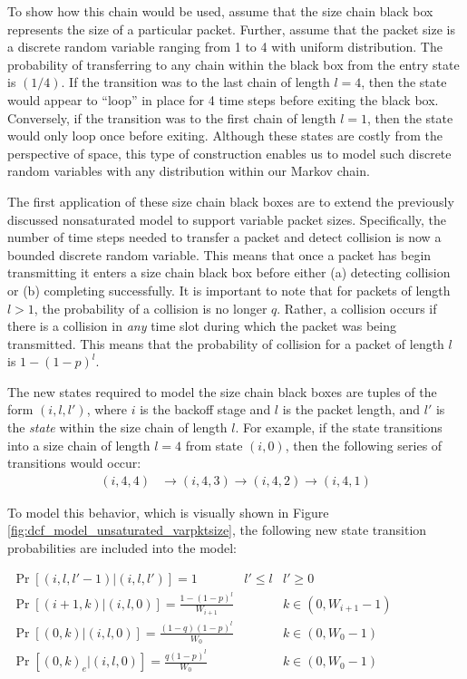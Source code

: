 \documentclass[conference]{IEEEtran}
\begin{document}
To show how this chain would be used, assume that the size chain black box represents the size of a particular packet. Further, assume that the packet size is a discrete random variable ranging from 1 to 4 with uniform distribution. The probability of transferring to any chain within the black box from the entry state is $(1/4)$. If the transition was to the last chain of length $l = 4$, then the state would appear to ``loop'' in place for 4 time steps before exiting the black box. Conversely, if the transition was to the first chain of length $l = 1$, then the state would only loop once before exiting. Although these states are costly from the perspective of space, this type of construction enables us to model such discrete random variables with any distribution within our Markov chain. 

The first application of these size chain black boxes are to extend the previously discussed nonsaturated model to support variable packet sizes. Specifically, the number of time steps needed to transfer a packet and detect collision is now a bounded discrete random variable. This means that once a packet has begin transmitting it enters a size chain black box before either (a) detecting collision or (b) completing successfully. It is important to note that for packets of length $l > 1$, the probability of a collision is no longer $q$. Rather, a collision occurs if there is a collision in \emph{any} time slot during which the packet was being transmitted. This means that the probability of collision for a packet of length $l$ is $1 - (1 - p)^l$. 

The new states required to model the size chain black boxes are tuples of the form $(i, l, l')$, where $i$ is the backoff stage and $l$ is the packet length, and $l'$ is the \emph{state} within the size chain of length $l$. For example, if the state transitions into a size chain of length $l = 4$ from state $(i, 0)$, then the following series of transitions would occur: 
\begin{align*}
(i, 4, 4) & \to (i, 4, 3) \to (i, 4, 2) \to (i, 4, 1)
\end{align*}

To model this behavior, which is visually shown in Figure \ref{fig:dcf_model_unsaturated_varpktsize}, the following new state transition probabilities are included into the model:

\begin{center}
\begin{math}
\boxed{
\begin{array}{lll}
\Pr[(i,l,l'-1) | (i,l,l')] = 1 & l' \leq l & l' \geq 0 \\
\Pr[(i+1,k) | (i,l,0)] = \frac{1 - (1 - p)^l}{W_{i+1}} & ~ & k \in (0, W_{i+1} - 1) \\
\Pr[(0,k) | (i,l,0)] = \frac{(1 - q)(1 - p)^l}{W_0} & ~ & k \in (0, W_{0} - 1) \\
\Pr[(0,k)_e | (i,l,0)] = \frac{q(1 - p)^l}{W_0} & ~ & k \in (0, W_{0} - 1) \\
\end{array}
}
\end{math}
\end{center}
\end{document}
